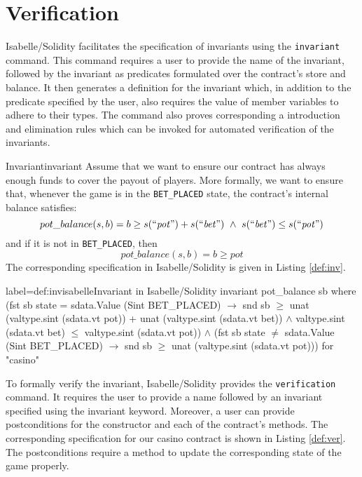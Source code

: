 \documentclass[a4paper,UKenglish,cleveref, autoref, thm-restate]{oasics-v2021}
\begin{document}
%
%

%
%
\section{Verification}
%
%
%
Isabelle/Solidity facilitates the specification of invariants using the \texttt{\color{isarblue}invariant} command.
This command requires a user to provide the name of the invariant, followed by the invariant as predicates formulated over the contract's store and balance.
It then generates a definition for the invariant which, in addition to the predicate specified by the user, also requires the value of member variables to adhere to their types.
The command also proves corresponding a introduction and elimination rules which can be invoked for automated verification of the invariants.

\begin{Example}{Invariant}{invariant}
	Assume that we want to ensure our contract has always enough funds to cover the payout of players.
  More formally, we want to ensure that, whenever the game is in the \texttt{BET\_PLACED} state, the contract's internal balance satisfies:
	\begin{equation}
	  pot\_balance(s, b)=b \ge s(\text{``$\mathit{pot}$''}) + s(\text{``$\mathit{bet}$''})~\wedge~s(\text{``$\mathit{bet}$''}) \leq s(\text{``$\mathit{pot}$''})
	\end{equation}\label{eq:inv}
  and if it is not in \texttt{BET\_PLACED}, then 
  \begin{equation}
		pot\_balance(s, b)=b \ge pot 
  \end{equation}\label{eq:inv1}
%
The corresponding specification in Isabelle/Solidity is given in Listing \ref{def:inv}.
\begin{code}{label={def:inv}}{isabelle}{Invariant in Isabelle/Solidity}
invariant pot_balance sb where
  (fst sb state = sdata.Value (Sint BET_PLACED)
    $\longrightarrow$ snd sb $\geq$ unat (valtype.sint (sdata.vt pot)) 
	                + unat (valtype.sint (sdata.vt bet))
        $\wedge$ valtype.sint (sdata.vt bet) $\leq$ valtype.sint (sdata.vt pot)) $\wedge$
  (fst sb state $\neq$ sdata.Value (Sint BET_PLACED)
    $\longrightarrow$  snd sb $\geq$ unat (valtype.sint (sdata.vt pot)))
  for "casino"
\end{code}
\end{Example}
%

%
To formally verify the invariant, Isabelle/Solidity provides the \texttt{\color{isarblue}verification} command. 
%
It requires the user to provide a name followed by an invariant specified using the invariant keyword.
Moreover, a user can provide postconditions for the constructor and each of the contract's methods.
The corresponding specification for our casino contract is shown in Listing \ref{def:ver}.
The postconditions require a method to update the corresponding state of the game properly.
\end{document}
